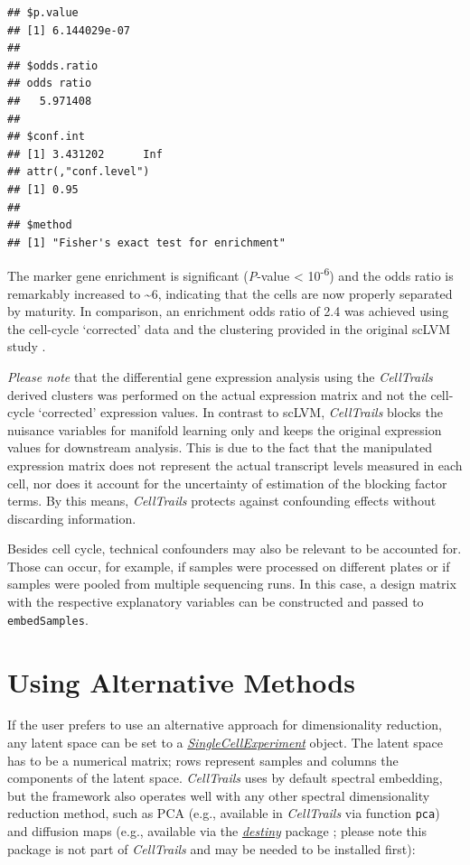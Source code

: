 \documentclass[]{book}
\theoremstyle{definition}
\theoremstyle{definition}
\theoremstyle{definition}
\theoremstyle{remark}
\begin{document}
\begin{verbatim}
## $p.value
## [1] 6.144029e-07
## 
## $odds.ratio
## odds ratio 
##   5.971408 
## 
## $conf.int
## [1] 3.431202      Inf
## attr(,"conf.level")
## [1] 0.95
## 
## $method
## [1] "Fisher's exact test for enrichment"
\end{verbatim}

The marker gene enrichment is significant (\emph{P}-value \textless{}
10\textsuperscript{-6}) and the odds ratio is remarkably increased to
\textasciitilde{}6, indicating that the cells are now properly separated
by maturity. In comparison, an enrichment odds ratio of 2.4 was achieved
using the cell-cycle `corrected' data and the clustering provided in the
original scLVM study \citep{buettner2015}.

\emph{Please note} that the differential gene expression analysis using
the \emph{CellTrails} derived clusters was performed on the actual
expression matrix and not the cell-cycle `corrected' expression values.
In contrast to scLVM, \emph{CellTrails} blocks the nuisance variables
for manifold learning only and keeps the original expression values for
downstream analysis. This is due to the fact that the manipulated
expression matrix does not represent the actual transcript levels
measured in each cell, nor does it account for the uncertainty of
estimation of the blocking factor terms. By this means,
\emph{CellTrails} protects against confounding effects without
discarding information.

Besides cell cycle, technical confounders may also be relevant to be
accounted for. Those can occur, for example, if samples were processed
on different plates or if samples were pooled from multiple sequencing
runs. In this case, a design matrix with the respective explanatory
variables can be constructed and passed to \texttt{embedSamples}.

\section{Using Alternative Methods}\label{using-alternative-methods-1}

If the user prefers to use an alternative approach for dimensionality
reduction, any latent space can be set to a
\emph{\href{http://bioconductor.org/packages/SingleCellExperiment}{SingleCellExperiment}}
object. The latent space has to be a numerical matrix; rows represent
samples and columns the components of the latent space.
\emph{CellTrails} uses by default spectral embedding, but the framework
also operates well with any other spectral dimensionality reduction
method, such as PCA (e.g., available in \emph{CellTrails} via function
\texttt{pca}) and diffusion maps (e.g., available via the
\emph{\href{http://bioconductor.org/packages/destiny}{destiny}} package
\citep{destiny}; please note this package is not part of
\emph{CellTrails} and may be needed to be installed first):
\end{document}

